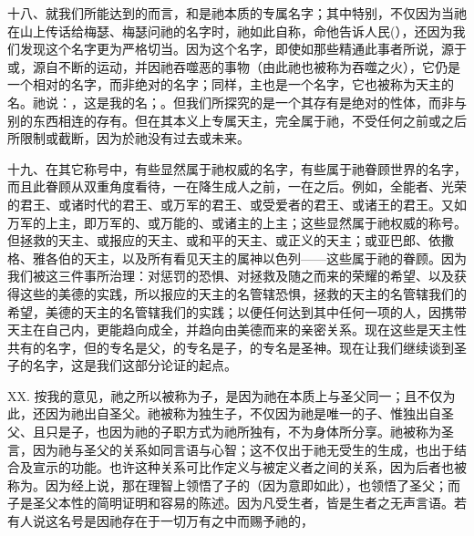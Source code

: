 十八、就我们所能达到的而言，和是祂本质的专属名字；其中特别，不仅因为当祂在山上传话给梅瑟、梅瑟问祂的名字时，祂如此自称，命他告诉人民(），还因为我们发现这个名字更为严格切当。因为这个名字，即使如那些精通此事者所说，源于或，源自不断的运动，并因祂吞噬恶的事物（由此祂也被称为吞噬之火），它仍是一个相对的名字，而非绝对的名字；同样，主也是一个名字，它也被称为天主的名。祂说：，这是我的名；。但我们所探究的是一个其存有是绝对的性体，而非与别的东西相连的存有。但在其本义上专属天主，完全属于祂，不受任何之前或之后所限制或截断，因为於祂没有过去或未来。\par

十九、在其它称号中，有些显然属于祂权威的名字，有些属于祂眷顾世界的名字，而且此眷顾从双重角度看待，一在降生成人之前，一在之后。例如，全能者、光荣的君王、或诸时代的君王、或万军的君王、或受爱者的君王、或诸王的君王。又如万军的上主，即万军的、或万能的、或诸主的上主；这些显然属于祂权威的称号。但拯救的天主、或报应的天主、或和平的天主、或正义的天主；或亚巴郎、依撒格、雅各伯的天主，以及所有看见天主的属神以色列——这些属于祂的眷顾。因为我们被这三件事所治理：对惩罚的恐惧、对拯救及随之而来的荣耀的希望、以及获得这些的美德的实践，所以报应的天主的名管辖恐惧，拯救的天主的名管辖我们的希望，美德的天主的名管辖我们的实践；以便任何达到其中任何一项的人，因携带天主在自己内，更能趋向成全，并趋向由美德而来的亲密关系。现在这些是天主性共有的名字，但的专名是父，的专名是子，的专名是圣神。现在让我们继续谈到圣子的名字，这是我们这部分论证的起点。\par

XX. 按我的意见，祂之所以被称为子，是因为祂在本质上与圣父同一；且不仅为此，还因为祂出自圣父。祂被称为独生子，不仅因为祂是唯一的子、惟独出自圣父、且只是子，也因为祂的子职方式为祂所独有，不为身体所分享。祂被称为圣言，因为祂与圣父的关系如同言语与心智；这不仅出于祂无受生的生成，也出于结合及宣示的功能。也许这种关系可比作定义与被定义者之间的关系，因为后者也被称为。因为经上说，那在理智上领悟了子的（因为意即如此），也领悟了圣父；而子是圣父本性的简明证明和容易的陈述。因为凡受生者，皆是生者之无声言语。若有人说这名号是因祂存在于一切万有之中而赐予祂的，\par

